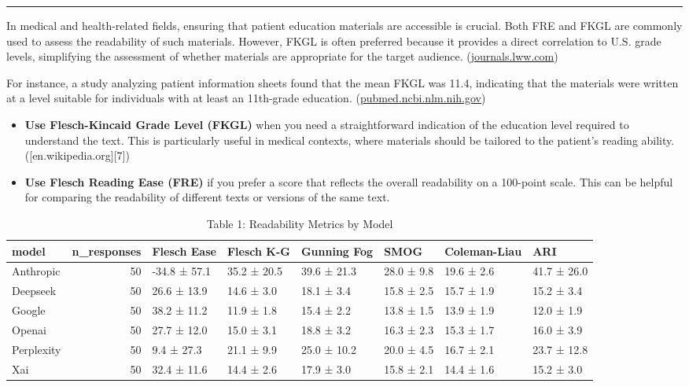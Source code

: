 \documentclass[
  11pt]{report}
\providecommand{\tightlist}{%
  \setlength{\itemsep}{0pt}\setlength{\parskip}{0pt}}\usepackage{longtable,booktabs,array}
\begin{document}
\begin{center}\rule{0.5\linewidth}{0.5pt}\end{center}

In medical and health-related fields, ensuring that patient education
materials are accessible is crucial. Both FRE and FKGL are commonly used
to assess the readability of such materials. However, FKGL is often
preferred because it provides a direct correlation to U.S. grade levels,
simplifying the assessment of whether materials are appropriate for the
target audience.
(\href{https://journals.lww.com/edhe/fulltext/2017/30010/assessing_reading_levels_of_health_information_.15.aspx}{journals.lww.com})

For instance, a study analyzing patient information sheets found that
the mean FKGL was 11.4, indicating that the materials were written at a
level suitable for individuals with at least an 11th-grade education.
(\href{https://pubmed.ncbi.nlm.nih.gov/36131293/}{pubmed.ncbi.nlm.nih.gov})

\begin{itemize}
\tightlist
\item
  \textbf{Use Flesch-Kincaid Grade Level (FKGL)} when you need a
  straightforward indication of the education level required to
  understand the text. This is particularly useful in medical contexts,
  where materials should be tailored to the patient's reading
  ability.({[}en.wikipedia.org{]}{[}7{]})
\item
  \textbf{Use Flesch Reading Ease (FRE)} if you prefer a score that
  reflects the overall readability on a 100-point scale. This can be
  helpful for comparing the readability of different texts or versions
  of the same text.
\end{itemize}

\begin{table}
\caption*{
{\large Table 1: Readability Metrics by Model}
} 
\fontsize{12.0pt}{14.4pt}\selectfont
\begin{tabular*}{\linewidth}{@{\extracolsep{\fill}}lrllllll}
\toprule
model & n\_responses & Flesch Ease & Flesch K-G & Gunning Fog & SMOG & Coleman-Liau & ARI \\ 
\midrule\addlinespace[2.5pt]
Anthropic & 50 & -34.8 ± 57.1 & 35.2 ± 20.5 & 39.6 ± 21.3 & 28.0 ± 9.8 & 19.6 ± 2.6 & 41.7 ± 26.0 \\ 
Deepseek & 50 & 26.6 ± 13.9 & 14.6 ± 3.0 & 18.1 ± 3.4 & 15.8 ± 2.5 & 15.7 ± 1.9 & 15.2 ± 3.4 \\ 
Google & 50 & 38.2 ± 11.2 & 11.9 ± 1.8 & 15.4 ± 2.2 & 13.8 ± 1.5 & 13.9 ± 1.9 & 12.0 ± 1.9 \\ 
Openai & 50 & 27.7 ± 12.0 & 15.0 ± 3.1 & 18.8 ± 3.2 & 16.3 ± 2.3 & 15.3 ± 1.7 & 16.0 ± 3.9 \\ 
Perplexity & 50 & 9.4 ± 27.3 & 21.1 ± 9.9 & 25.0 ± 10.2 & 20.0 ± 4.5 & 16.7 ± 2.1 & 23.7 ± 12.8 \\ 
Xai & 50 & 32.4 ± 11.6 & 14.4 ± 2.6 & 17.9 ± 3.0 & 15.8 ± 2.1 & 14.4 ± 1.6 & 15.2 ± 3.0 \\ 
\bottomrule
\end{tabular*}
\end{table}
\end{document}
